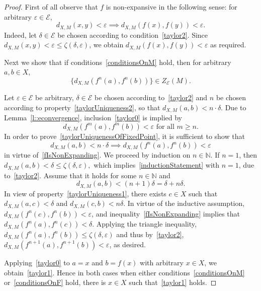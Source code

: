 \documentclass[12pt]{amsart}          %
\newcommand{\NN}{\mathbb N}
\newcommand{\EE}{\mathcal{E}}
\begin{document}
\begin{proof}
First of all observe that $f$ is non-expansive in the following sense: for arbitrary $\varepsilon\in\EE$,
\begin{equation}\label{fIsNonExpanding}
    d_{X,M}(x,y)< \varepsilon\implies d_{X,M}(f(x),f(y))<\varepsilon.
\end{equation}
Indeed, let $\delta\in \EE$ be chosen according to condition~\eqref{taylor2}. Since  $d_{X,M}(x,y)<\varepsilon \leq \zeta(\delta,\varepsilon  )$, we obtain $d_{X,M}(f(x),f(y))<\varepsilon$ as required. 

Next we show that if conditions~\ref{conditionsOnM} hold, then for arbitrary $a,b\in X$, 
\begin{equation}\label{taylor0}
  \{  d_{X,M}(f^n(a),f^{n}(b))\}\in Z_{\EE}(M).
\end{equation}

Let $\varepsilon\in\EE$ be arbitrary, $\delta\in\EE$ be chosen according to~\eqref{taylor2} and $n$ be chosen according to property~\eqref{taylorUniqueness2}, so that $d_{X,M}(a,b)<n\cdot \delta$. Due to Lemma~\ref{l::econvergence}, inclusion~\eqref{taylor0} is implied by \begin{equation}\label{taylorUniquenessOfFixedPoint}
d_{X,M}(f^m(a), f^m(b))< \varepsilon\text{ for all } m\geq n.
\end{equation}
In order to prove~\eqref{taylorUniquenessOfFixedPoint}, it is sufficient to show that 
\begin{equation}\label{inductionStatement}
d_{X,M}(a,b)<n\cdot \delta\implies d_{X,M}(f^n(a), f^n(b))< \varepsilon
\end{equation}
in virtue of~\eqref{fIsNonExpanding}. We proceed by induction on $n\in\NN$. If $n=1$, then 
$
d_{X,M}(a,b) < \delta \leq \zeta(\delta, \varepsilon),
$
which implies~\eqref{inductionStatement} with $n = 1$, due to~\eqref{taylor2}.
Assume that it holds for some $n\in\NN$ and 
$$
d_{X,M}(a,b)< (n+1)\delta = \delta + n\delta.
$$
In view of property~\eqref{taylorUniqueness1}, there exists $c\in X$ such that $d_{X,M}(a,c)<  \delta$ and $d_{X,M}(c,b) < n\delta$. In virtue of the inductive assumption, $d_{X,M}(f^n(c), f^n(b))< \varepsilon$, and  inequality~\eqref{fIsNonExpanding} implies that  $d_{X,M} (f^n(a),f^n(c))< \delta$. Applying the triangle inequality, $
d_{X,M} (f^n(a),f^n(b))
\leq \zeta( \delta, \varepsilon)
$
and thus by~\eqref{taylor2}, $d_{X,M} (f^{n+1}(a),f^{n+1}(b))< \varepsilon$, as desired.

Applying~\eqref{taylor0} to $a = x$ and $b = f(x)$ with arbitrary $x\in X$, we obtain~\eqref{taylor1}. Hence in both cases when either conditions~\ref{conditionsOnM} or~\ref{conditionsOnF} hold, there is $x\in X$ such that~\eqref{taylor1} holds.


\end{proof}
\end{document}
